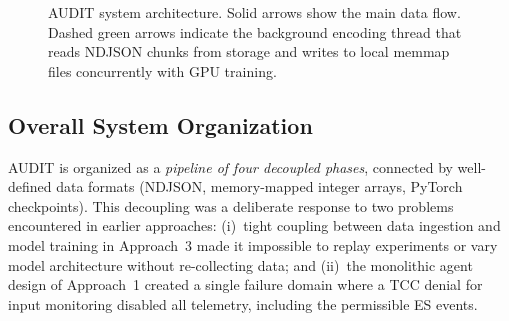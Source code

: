 \documentclass[letterpaper,twocolumn,10pt]{article}
\begin{document}
\begin{figure}[t]
\caption{AUDIT system architecture.  Solid arrows show the main
data flow.  Dashed green arrows indicate the background encoding
thread that reads NDJSON chunks from storage and writes to local
memmap files concurrently with GPU training.}
\label{fig:architecture}
\end{figure}


\subsection{Overall System Organization}

AUDIT is organized as a \emph{pipeline of four decoupled phases},
connected by well-defined data formats (NDJSON, memory-mapped
integer arrays, PyTorch checkpoints).  This decoupling was a
deliberate response to two problems encountered in earlier
approaches: (i)~tight coupling between data ingestion and model
training in Approach~3 made it impossible to replay experiments or
vary model architecture without re-collecting data; and (ii)~the
monolithic agent design of Approach~1 created a single failure
domain where a TCC denial for input monitoring disabled all
telemetry, including the permissible ES events.
\end{document}
